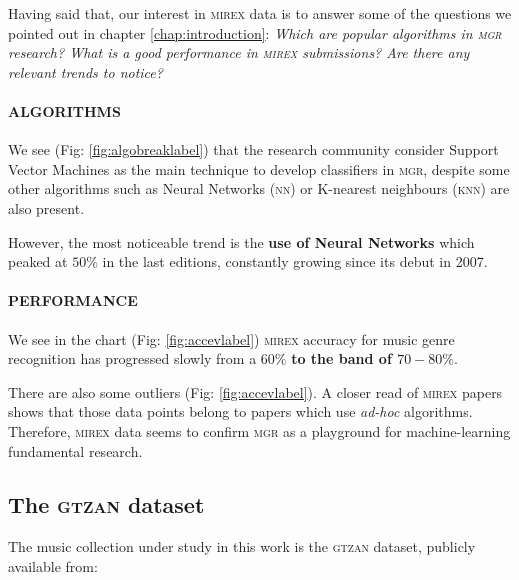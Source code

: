 Having said that, our interest in \textsc{mirex} data is to answer some of the questions we pointed out in chapter \ref{chap:introduction}: {\it Which are popular algorithms in \textsc{\textsc{mgr}} research? What is a good performance in \textsc{mirex} submissions? Are there any relevant trends to notice?}

\paragraph{ALGORITHMS}

We see (Fig: \ref{fig:algobreaklabel}) that the research community consider Support Vector Machines as the main technique to develop classifiers in \textsc{\textsc{mgr}}, despite some other algorithms such as Neural Networks (\textsc{nn}) or K-nearest neighbours (\textsc{knn}) are also present.



However, the most noticeable trend is the {\bf use of Neural Networks} which peaked at $50\%$ in the last editions, constantly growing since its debut in 2007.


\paragraph{PERFORMANCE}

We see in the chart (Fig: \ref{fig:accevlabel}) \textsc{mirex} accuracy for music genre recognition has progressed slowly from a $60\%$ {\bf to the band of $70 - 80\%$}.

There are also some outliers (Fig: \ref{fig:accevlabel}). A closer read of \textsc{mirex} papers shows that those data points belong to papers which use {\it ad-hoc} algorithms. Therefore, \textsc{mirex} data seems to confirm \textsc{\textsc{mgr}} as a playground for machine-learning fundamental research.


\subsection{The \textsc{gtzan} dataset}

The music collection under study in this work is the \textsc{gtzan} dataset, publicly available from:

